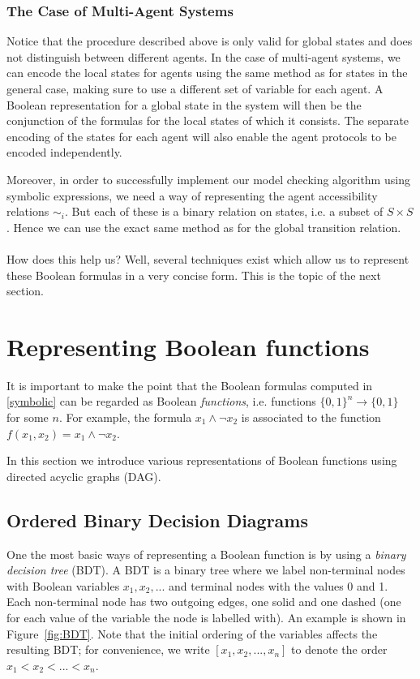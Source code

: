 \documentclass[11pt]{report}
\begin{document}
\subsubsection{The Case of Multi-Agent Systems}

Notice that the procedure described above is only valid for global states and does not distinguish between different agents. 
In the case of multi-agent systems, we can encode the local states for agents using the same method as for states in the general case, making sure to use a different set of variable for each agent. A Boolean representation for a global state in the system will then be the conjunction of the formulas for the local states of which it consists. The separate encoding of the states for each agent will also enable the agent protocols to be encoded independently.

Moreover, in order to successfully implement our model checking algorithm using symbolic expressions, we need a way of representing the agent accessibility relations $\sim_i$.
But each of these is a binary relation on states, i.e. a subset of $S \times S$. Hence we can use the exact same method as for the global transition relation. 
\\\\

How does this help us? Well, several techniques exist which allow us to represent these Boolean formulas in a very concise form. This is the topic of the next section.

\section{Representing Boolean functions}

It is important to make the point that the Boolean formulas computed in \ref{symbolic} can be regarded as Boolean \textit{functions}, i.e. functions $\{0, 1\}^n \rightarrow \{0, 1\}$ for some $n$. For example, the formula $x_1 \land \lnot x_2$ is associated to the function $f(x_1, x_2) = x_1 \land \lnot x_2$.

In this section we introduce various representations of Boolean functions using directed acyclic graphs (DAG). 

\subsection{Ordered Binary Decision Diagrams}

One the most basic ways of representing a Boolean function is by using a \textit{binary decision tree} (BDT). A BDT is a binary tree where we label non-terminal nodes with Boolean variables $x_1, x_2, ...$ and terminal nodes with the values 0 and 1. Each non-terminal node has two outgoing edges, one solid and one dashed (one for each value of the variable the node is labelled with). An example is shown in Figure~\ref{fig:BDT}. Note that the initial ordering of the variables affects the resulting BDT; for convenience, we write $[x_1, x_2, ..., x_n]$ to denote the order $x_1 < x_2 < ... < x_n$.
\end{document}
